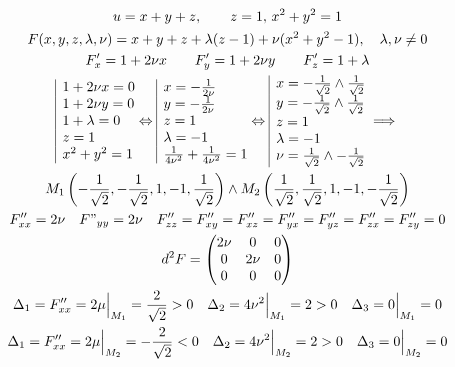 \documentclass[a4paper,fleqn,12pt]{article}
\theoremstyle{definition}
\begin{document}
\begin{gather*}
u= x+y+z, \qquad z = 1, \, x^2 + y^2 = 1\\
F(x,y,z,\lambda, \nu) = x+y+z + \lambda(z-1) + \nu(x^2+y^2-1), \quad \lambda, \nu \neq 0\\
F'_x = 1 + 2\nu x \qquad F'_y = 1 + 2\nu y \qquad F'_z = 1 + \lambda \\
\begin{array}{|l@{}}
1 + 2\nu x = 0 \\
1 + 2\nu y = 0\\
1 + \lambda = 0\\
z = 1 \\
x^2+y^2 = 1
\end{array}\Leftrightarrow 
\begin{array}{|l@{}}
x = - \frac{1}{2\nu} \\
y = - \frac{1}{2\nu} \\
z = 1\\
\lambda = -1 \\
\frac{1}{4\nu^2} + \frac{1}{4\nu^2} = 1
\end{array}\Leftrightarrow 
\begin{array}{|l@{}}
x = -\frac{1}{\sqrt{2}} \land \frac{1}{\sqrt{2}}\\
y = -\frac{1}{\sqrt{2}} \land \frac{1}{\sqrt{2}}\\
z = 1\\
\lambda = -1\\
\nu = \frac{1}{\sqrt{2}} \land -\frac{1}{\sqrt{2}}\\
\end{array} \implies \\
M_1 \left( -\frac{1}{\sqrt{2}}, -\frac{1}{\sqrt{2}}, 1, -1, \frac{1}{\sqrt{2}}\right)\land
M_2  \left( \frac{1}{\sqrt{2}}, \frac{1}{\sqrt{2}}, 1, -1, -\frac{1}{\sqrt{2}}\right)\\
F''_{xx} = 2\nu \quad F"_{yy} = 2\nu \quad F''_{zz} = F''_{xy} = F''_{xz} = F''_{yx} = F''_{yz} = F''_{zx} = F''_{zy} = 0\\
d^2F = \begin{pmatrix}
2\nu & 0 & 0 \\
0 & 2\nu & 0 \\
0 & 0 & 0 \\
\end{pmatrix} \\
\Delta_1 = F''_{xx} = 2\mu \Big|_{M_1} =\frac{2}{\sqrt{2}} > 0 \quad \Delta_2 = 4\nu^2 \Big|_{M_1} = 2 > 0 \quad \Delta_3 = 0 \Big|_{M_1} = 0 \\ 
\Delta_1 = F''_{xx} = 2\mu \Big|_{M_2} = -\frac{2}{\sqrt{2}} < 0 \quad \Delta_2 = 4\nu^2 \Big|_{M_2} = 2 > 0 \quad \Delta_3 = 0 \Big|_{M_2} = 0 \\ 

\end{gather*}
\end{document}
